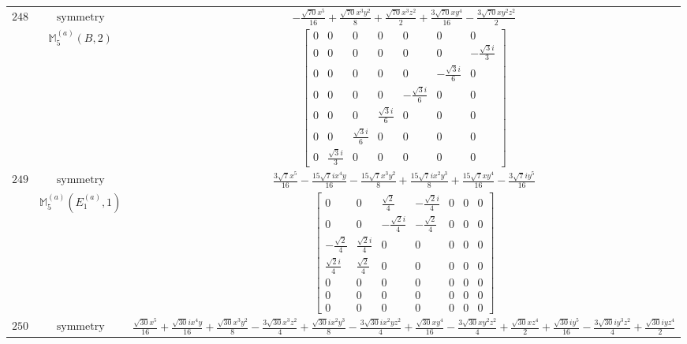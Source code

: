 \documentclass[fleqn,8pt,landscape]{jsarticle}
\begin{document}
\begin{longtable}{ccc}
$ 248 $ & $ \text{symmetry} $ & $ - \frac{\sqrt{70} x^{5}}{16} + \frac{\sqrt{70} x^{3} y^{2}}{8} + \frac{\sqrt{70} x^{3} z^{2}}{2} + \frac{3 \sqrt{70} x y^{4}}{16} - \frac{3 \sqrt{70} x y^{2} z^{2}}{2} $ \\
$  $ & $ \mathbb{M}_{5}^{(a)}(B,2) $ & $ \begin{bmatrix} 0 & 0 & 0 & 0 & 0 & 0 & 0 \\ 0 & 0 & 0 & 0 & 0 & 0 & - \frac{\sqrt{3} i}{3} \\ 0 & 0 & 0 & 0 & 0 & - \frac{\sqrt{3} i}{6} & 0 \\ 0 & 0 & 0 & 0 & - \frac{\sqrt{3} i}{6} & 0 & 0 \\ 0 & 0 & 0 & \frac{\sqrt{3} i}{6} & 0 & 0 & 0 \\ 0 & 0 & \frac{\sqrt{3} i}{6} & 0 & 0 & 0 & 0 \\ 0 & \frac{\sqrt{3} i}{3} & 0 & 0 & 0 & 0 & 0 \end{bmatrix} $ \\ \hline
$ 249 $ & $ \text{symmetry} $ & $ \frac{3 \sqrt{7} x^{5}}{16} - \frac{15 \sqrt{7} i x^{4} y}{16} - \frac{15 \sqrt{7} x^{3} y^{2}}{8} + \frac{15 \sqrt{7} i x^{2} y^{3}}{8} + \frac{15 \sqrt{7} x y^{4}}{16} - \frac{3 \sqrt{7} i y^{5}}{16} $ \\
$  $ & $ \mathbb{M}_{5}^{(a)}(E_{1}^{(a)},1) $ & $ \begin{bmatrix} 0 & 0 & \frac{\sqrt{2}}{4} & - \frac{\sqrt{2} i}{4} & 0 & 0 & 0 \\ 0 & 0 & - \frac{\sqrt{2} i}{4} & - \frac{\sqrt{2}}{4} & 0 & 0 & 0 \\ - \frac{\sqrt{2}}{4} & \frac{\sqrt{2} i}{4} & 0 & 0 & 0 & 0 & 0 \\ \frac{\sqrt{2} i}{4} & \frac{\sqrt{2}}{4} & 0 & 0 & 0 & 0 & 0 \\ 0 & 0 & 0 & 0 & 0 & 0 & 0 \\ 0 & 0 & 0 & 0 & 0 & 0 & 0 \\ 0 & 0 & 0 & 0 & 0 & 0 & 0 \end{bmatrix} $ \\ \hline
$ 250 $ & $ \text{symmetry} $ & $ \frac{\sqrt{30} x^{5}}{16} + \frac{\sqrt{30} i x^{4} y}{16} + \frac{\sqrt{30} x^{3} y^{2}}{8} - \frac{3 \sqrt{30} x^{3} z^{2}}{4} + \frac{\sqrt{30} i x^{2} y^{3}}{8} - \frac{3 \sqrt{30} i x^{2} y z^{2}}{4} + \frac{\sqrt{30} x y^{4}}{16} - \frac{3 \sqrt{30} x y^{2} z^{2}}{4} + \frac{\sqrt{30} x z^{4}}{2} + \frac{\sqrt{30} i y^{5}}{16} - \frac{3 \sqrt{30} i y^{3} z^{2}}{4} + \frac{\sqrt{30} i y z^{4}}{2} $ \\

\end{longtable}
\end{document}
